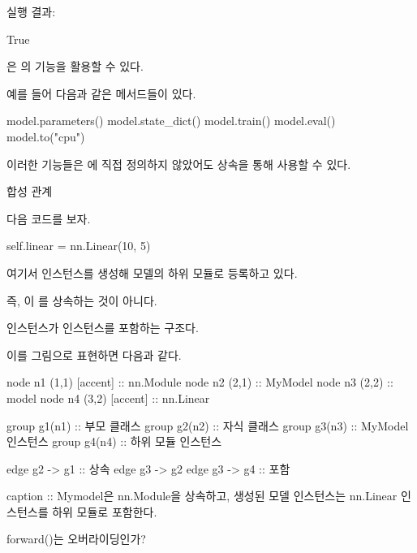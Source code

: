 실행 결과:

\begin{dhkzsh}
True
\end{dhkzsh}

은 의 기능을 활용할 수 있다.

예를 들어 다음과 같은 메서드들이 있다.

\begin{dhkcode}
model.parameters()
model.state_dict()
model.train()
model.eval()
model.to("cpu")
\end{dhkcode}

이러한 기능들은 에 직접 정의하지 않았어도 상속을 통해 사용할 수 있다.

\begin{dhknote}
\begin{dhksmry}[centered]
합성 관계
\end{dhksmry}
\end{dhknote}

다음 코드를 보자.

\begin{dhkcode}
self.linear = nn.Linear(10, 5)
\end{dhkcode}

여기서  인스턴스를 생성해 모델의 하위 모듈로 등록하고 있다.

즉, 이 를 상속하는 것이 아니다.

 인스턴스가  인스턴스를 포함하는 구조다.

이를 그림으로 표현하면 다음과 같다.

\begin{dhkgraph}[uniform]
node n1 (1,1) [accent] :: nn.Module
node n2 (2,1) :: MyModel
node n3 (2,2) :: model
node n4 (3,2) [accent] :: nn.Linear

group g1(n1) :: 부모 클래스
group g2(n2) :: 자식 클래스
group g3(n3) :: MyModel 인스턴스
group g4(n4) :: 하위 모듈 인스턴스

edge g2 -> g1 :: 상속
edge g3 -> g2
edge g3 -> g4 :: 포함

caption :: Mymodel은 nn.Module을 상속하고, 생성된 모델 인스턴스는 nn.Linear 인스턴스를 하위 모듈로 포함한다.
\end{dhkgraph}

\begin{dhknote}
\begin{dhksmry}[centered]
forward()는 오버라이딩인가?
\end{dhksmry}
\end{dhknote}

